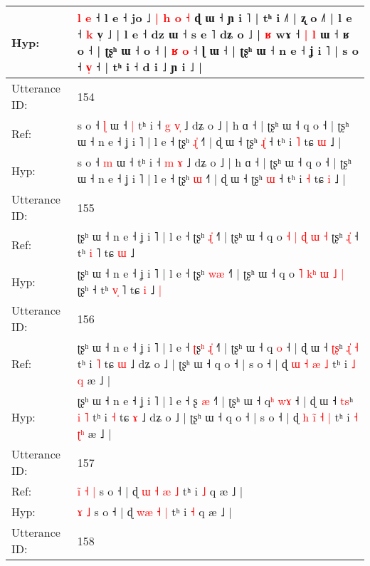 \documentclass[10pt]{article}
\DeclareRobustCommand{\hl}[1]{{\textcolor{red}{#1}}}
\begin{document}
\begin{longtable}{ll}
 \\
Hyp: & \hl{l} \hl{}\hl{e} ˧\hl{}\hl{}\hl{}\hl{}\hl{}\hl{}\hl{}\hl{} l e ˧ jo ˩ \hl{|} \hl{h} \hl{o} \hl{˧} ɖ ɯ ˧ ɲ i ˥ | tʰ i ˩˥ | ʐ o ˩˥ | l e ˧ \hl{k} v̩ ˩ | l e ˧ dz ɯ ˧ s e ˥ dʑ o ˩ | \hl{ʁ} wɤ ˧\hl{ }\hl{|} \hl{l} ɯ ˧ ʁ o ˧ | ʈʂʰ ɯ ˧\hl{}\hl{} o ˧ | \hl{ʁ} \hl{}\hl{o} ˧ ɭ ɯ ˧ | ʈʂʰ ɯ ˧ n e ˧ ʝ i ˥ | s o ˧ \hl{}\hl{v}\hl{̩} ˧ | tʰ i ˧ d i ˩ ɲ i\hl{}\hl{}\hl{}\hl{}\hl{}\hl{} ˩ |
 \\
\midrule
Utterance ID: & 154 \\
Ref: & s o ˧ \hl{ɭ} ɯ ˧\hl{ }\hl{|} tʰ i ˧ \hl{g} \hl{v}\hl{̩} ˩ dʑ o ˩ | h ɑ ˧ | ʈʂʰ ɯ ˧ q o ˧ | ʈʂʰ ɯ ˧ n e ˧ ʝ i ˥ | l e ˧ ʈʂʰ \hl{ɻ}\hl{̍} ˧˥ | ɖ ɯ ˧ ʈʂʰ \hl{ɻ}\hl{̍} ˧ tʰ i \hl{˥} tɕ \hl{ɯ} ˩ |
 \\
Hyp: & s o ˧ \hl{m} ɯ ˧\hl{}\hl{} tʰ i ˧ \hl{m} \hl{}\hl{ɤ} ˩ dʑ o ˩ | h ɑ ˧ | ʈʂʰ ɯ ˧ q o ˧ | ʈʂʰ ɯ ˧ n e ˧ ʝ i ˥ | l e ˧ ʈʂʰ \hl{}\hl{ɯ} ˧˥ | ɖ ɯ ˧ ʈʂʰ \hl{}\hl{ɯ} ˧ tʰ i \hl{˧} tɕ \hl{i} ˩ |
 \\
\midrule
Utterance ID: & 155 \\
Ref: & ʈʂʰ ɯ ˧ n e ˧ ʝ i ˥ | l e ˧ ʈʂʰ \hl{ɻ}\hl{̍} ˧˥ | ʈʂʰ ɯ ˧ q o \hl{˧} \hl{}\hl{|} \hl{ɖ} \hl{ɯ} \hl{˧} ʈʂʰ\hl{ }\hl{ɻ}\hl{̍} ˧ tʰ \hl{}\hl{i} ˥ tɕ \hl{ɯ} ˩\hl{}\hl{}
 \\
Hyp: & ʈʂʰ ɯ ˧ n e ˧ ʝ i ˥ | l e ˧ ʈʂʰ \hl{w}\hl{æ} ˧˥ | ʈʂʰ ɯ ˧ q o \hl{˥} \hl{k}\hl{ʰ} \hl{ɯ} \hl{˩} \hl{|} ʈʂʰ\hl{}\hl{}\hl{} ˧ tʰ \hl{v}\hl{̩} ˥ tɕ \hl{i} ˩\hl{ }\hl{|}
 \\
\midrule
Utterance ID: & 156 \\
Ref: & ʈʂʰ ɯ ˧ n e ˧ ʝ i ˥ | l e ˧ \hl{ʈ}ʂ\hl{ʰ} \hl{ɻ}\hl{̍} ˧˥ | ʈʂʰ ɯ ˧ q\hl{} \hl{}\hl{o} ˧ | ɖ ɯ ˧ \hl{ʈ}\hl{ʂ}ʰ \hl{ɻ}\hl{̍} \hl{˧} tʰ i \hl{˥} tɕ \hl{ɯ} ˩ dʑ o ˩ | ʈʂʰ ɯ ˧ q o ˧ | s o ˧ | ɖ \hl{ɯ} \hl{}\hl{˧} \hl{æ} \hl{˩} tʰ i \hl{˩} \hl{}\hl{q} æ ˩ |
 \\
Hyp: & ʈʂʰ ɯ ˧ n e ˧ ʝ i ˥ | l e ˧ \hl{}ʂ\hl{} \hl{}\hl{æ} ˧˥ | ʈʂʰ ɯ ˧ q\hl{ʰ} \hl{w}\hl{ɤ} ˧ | ɖ ɯ ˧ \hl{t}\hl{s}ʰ \hl{}\hl{i} \hl{˥} tʰ i \hl{˧} tɕ \hl{ɤ} ˩ dʑ o ˩ | ʈʂʰ ɯ ˧ q o ˧ | s o ˧ | ɖ \hl{h} \hl{i}\hl{̃} \hl{˧} \hl{|} tʰ i \hl{˧} \hl{ʈ}\hl{ʰ} æ ˩ |
 \\
\midrule
Utterance ID: & 157 \\
Ref: & \hl{i}\hl{̃}\hl{ }\hl{˧} \hl{|} s o ˧ | ɖ \hl{ɯ}\hl{ }\hl{˧} \hl{æ} \hl{˩} tʰ i \hl{˩} q æ ˩ |
 \\
Hyp: & \hl{}\hl{}\hl{}\hl{ɤ} \hl{˩} s o ˧ | ɖ \hl{}\hl{w}\hl{æ} \hl{˧} \hl{|} tʰ i \hl{˧} q æ ˩ |
 \\
\midrule
Utterance ID: & 158 \\

\end{longtable}
\end{document}
